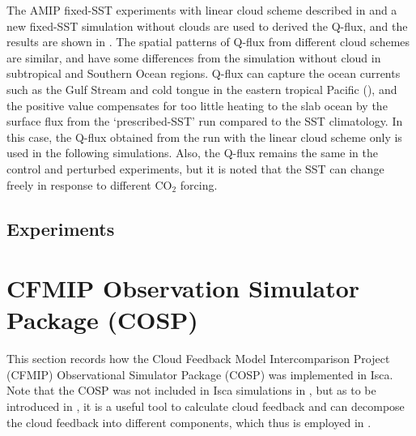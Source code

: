 The AMIP fixed-SST experiments with linear cloud scheme described in  and a new fixed-SST simulation without clouds are used to derived the Q-flux, and the results are shown in . The spatial patterns of Q-flux from different cloud schemes are similar, and have some differences from the simulation without cloud in subtropical and Southern Ocean regions. Q-flux can capture the ocean currents such as the Gulf Stream and cold tongue in the eastern tropical Pacific (), and the positive value compensates for too little heating to the slab ocean by the surface flux from the `prescribed-SST’ run compared to the SST climatology. In this case, the Q-flux obtained from the run with the linear cloud scheme only is used in the following simulations. Also, the Q-flux remains the same in the control and perturbed experiments, but it is noted that the SST can change freely in response to different CO$_2$ forcing. 

\subsection{Experiments}


\section{CFMIP Observation Simulator Package (COSP)}
\label{sec:cosp}

This section records how the Cloud Feedback Model Intercomparison Project (CFMIP) Observational Simulator Package (COSP) was implemented in Isca. Note that the COSP was not included in Isca simulations in , but as to be introduced in , it is a useful tool to calculate cloud feedback and can decompose the cloud feedback into different components, which thus is employed in . 

